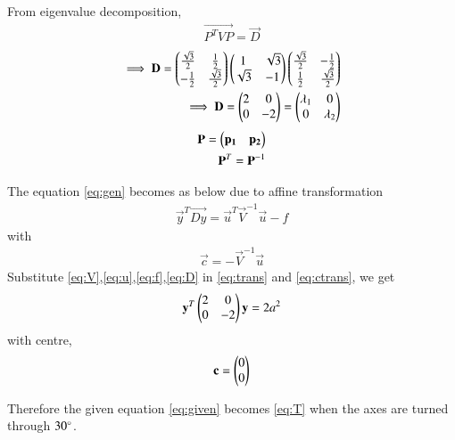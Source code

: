 \documentclass[journal,12pt,twocolumn]{IEEEtran}
\begin{document}
From eigenvalue decomposition,
\begin{align}
    \vec{P^TVP}=\vec{D}\label{eq:eigval}
\end{align}
\begin{align}
    \implies\mathbf{D}=\begin{pmatrix}\frac{\sqrt{3}}{2} & \frac{1}{2} \\ -\frac{1}{2} & \frac{\sqrt{3}}{2}\end{pmatrix}\begin{pmatrix}1 & \sqrt{3} \\ \sqrt{3} & -1\end{pmatrix}\begin{pmatrix}\frac{\sqrt{3}}{2} & -\frac{1}{2} \\ \frac{1}{2} & \frac{\sqrt{3}}{2}\end{pmatrix}\\
    \implies\mathbf{D}=\begin{pmatrix}2 & 0 \\ 0 & -2\end{pmatrix}=\begin{pmatrix}\lambda_1 & 0 \\ 0 & \lambda_2\end{pmatrix}\label{eq:D}
\end{align}
\begin{align}
    \mathbf{P}=\begin{pmatrix}\mathbf{p_1} & \mathbf{p_2}\end{pmatrix}\\
    \mathbf{P}^T=\mathbf{P}^{-1}
\end{align}

The equation \eqref{eq:gen} becomes as below due to affine transformation
\begin{align}
    \vec{y}^T\vec{Dy}=\vec{u}^T\vec{V}^{-1}\vec{u}-f\label{eq:trans}
\end{align}
with 
\begin{align}
    \vec{c}=-\vec{V}^{-1}\vec{u}\label{eq:ctrans}
\end{align}
Substitute \eqref{eq:V},\eqref{eq:u},\eqref{eq:f},\eqref{eq:D} in \eqref{eq:trans} and \eqref{eq:ctrans}, we get
\begin{align}
    \mathbf{y}^T\begin{pmatrix}2 & 0 \\ 0 & -2\end{pmatrix}\mathbf{y}=2a^2\label{eq:T}
\end{align}
with centre,
\begin{align}
    \mathbf{c}=\begin{pmatrix}0 \\ 0\end{pmatrix}
\end{align}

Therefore the given equation \eqref{eq:given} becomes \eqref{eq:T} when the axes are turned through $30\degree$.
\end{document}
